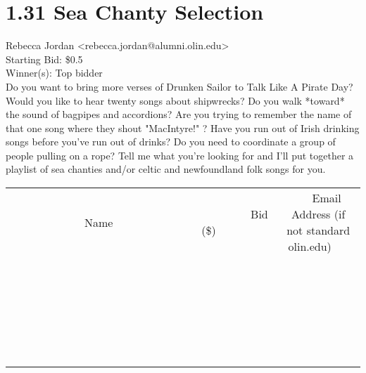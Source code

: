 \documentclass[11pt]{article}
\begin{document}
					\section*{1.31 Sea Chanty Selection}
					Rebecca Jordan <rebecca.jordan@alumni.olin.edu> \\
					Starting Bid: \$0.5 \\
					Winner(s): Top bidder \\
					Do you want to bring more verses of Drunken Sailor to Talk Like A Pirate Day?  Would you like to hear twenty songs about shipwrecks? Do you walk *toward* the sound of bagpipes and accordions? Are you trying to remember the name of that one song where they shout "MacIntyre!" ? Have you run out of Irish drinking songs before you've run out of drinks? Do you need to coordinate a group of people pulling on a rope? Tell me what you're looking for and I'll put together a playlist of sea chanties and/or celtic and newfoundland folk songs for you. \\
					[6ex]
					\begin{tabular}{c c c}
						~~~~~~~~~~~~~Name~~~~~~~~~~~~~ & ~~~~~~~~~Bid (\$)~~~~~~~~~ & ~~~Email Address (if not standard olin.edu)~~~ \\
				
 & & \\
\hline
 & & \\
\hline
 & & \\
\hline
 & & \\
\hline
 & & \\
\hline
 & & \\
\hline
 & & \\
\hline
 & & \\
\hline
 & & \\
\hline
 & & \\
\hline
 & & \\
\hline
 & & \\
\hline
 & & \\
\hline
 & & \\
\hline
 & & \\
\hline
 & & \\
\hline
 & & \\
\hline
 & & \\
\hline
 & & \\
\hline
 & & \\
\hline
 & & \\
\hline
 & & \\
\hline
 & & \\
\hline
 & & \\
\hline
 & & \\
\hline
 & & \\
\hline
					\end{tabular}
					\clearpage
				
\end{document}
